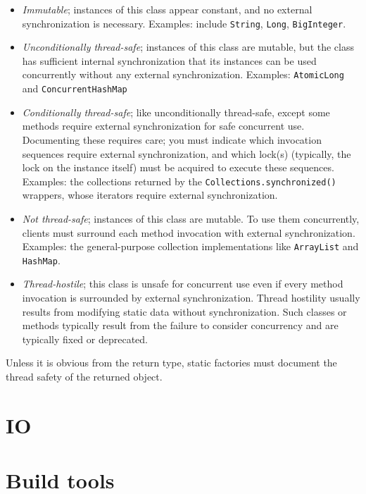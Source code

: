 \documentclass[table, xcdraw]{article}%
\begin{document}
\begin{itemize}
    \item \emph{Immutable}; instances of this class appear constant, and no external synchronization is necessary. Examples: include \texttt{String}, \texttt{Long}, \texttt{BigInteger}.
    \item \emph{Unconditionally thread-safe}; instances of this class are mutable, but the class has sufficient internal synchronization that its instances can be used concurrently without any external synchronization. Examples: \texttt{AtomicLong} and \texttt{ConcurrentHashMap}
    \item \emph{Conditionally thread-safe}; like unconditionally thread-safe, except some methods require external synchronization for safe concurrent use. Documenting these requires care; you must indicate which invocation sequences require external synchronization, and which lock(s) (typically, the lock on the instance itself) must be acquired to execute these sequences. Examples: the collections returned by the \texttt{Collections.synchronized()} wrappers, whose iterators require external synchronization.
    \item \emph{Not thread-safe}; instances of this class are mutable. To use them concurrently, clients must surround each method invocation with external synchronization. Examples: the general-purpose collection implementations like \texttt{ArrayList} and \texttt{HashMap}.
    \item \emph{Thread-hostile}; this class is unsafe for concurrent use even if every method invocation is surrounded by external synchronization. Thread hostility usually results from modifying static data without synchronization. Such classes or methods typically result from the failure to consider concurrency and are typically fixed or deprecated.
\end{itemize}

Unless it is obvious from the return type, static factories must document the thread safety of the returned object.

\section{IO}



\section{Build tools}
\end{document}
